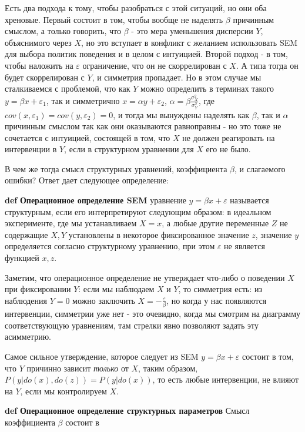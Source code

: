 \documentclass[fleqn]{article}
\def\define#1{\textbf{def} \textbf{#1}}
\numberwithin{equation}{section}
\numberwithin{theorem}{section}
\numberwithin{figure}{section}
\numberwithin{lemma}{section}
\numberwithin{corollary}{section}
\begin{document}
Есть два подхода к тому, чтобы разобраться с этой ситуаций, но они оба хреновые. Первый состоит в том, чтобы вообще не наделять $\beta$ причинным смыслом, а только говорить, что $\beta$ - это мера уменьшения дисперсии $Y$, объяснимого через $X$, но это вступает в конфликт с желанием использовать SEM для выбора политик поведения и в целом с интуицией. Второй подход - в том, чтобы наложить на $\varepsilon$ ограничение, что он не скоррелирован с $X$. А типа тогда он будет скоррелирован с $Y$, и симметрия пропадает. Но в этом случае мы сталкиваемся с проблемой, что как $Y$ можно определить в терминах такого $y = \beta x + \varepsilon_1$, так и симметрично $x = \alpha y + \varepsilon_2$, $\alpha = \beta \frac{\sigma_X^2}{\sigma_Y^2}$, где $cov(x, \varepsilon_1) = cov(y, \varepsilon_2) = 0$, и тогда мы вынуждены наделять как $\beta$, так и $\alpha$ причинным смыслом так как они оказываются равноправны - но это тоже не сочетается с интуицией, состоящей в том, что $X$ не должен реагировать на интервенции в $Y$, если в структурном уравнении для $X$ его не было.

В чем же тогда смысл структурных уравнений, коэффициента $\beta$, и слагаемого ошибки?  Ответ дает следующее определение:

\define{Операционное определение SEM} уравнение $y = \beta x + \varepsilon$ называется структурным, если его интерпретируют следующим образом: в идеальном эксперименте, где мы устанавливаем $X = x$, а любые другие переменные $Z$ не содержащие $X,Y$ установлены в некоторое фиксированное значение $z$, значение $y$ определяется согласно структурному уравнению, при этом $\varepsilon$ не является функцией $x,z$.

Заметим, что операционное определение не утверждает что-либо о поведении $X$ при фиксировании $Y$: если мы наблюдаем $X$ и $Y$, то симметрия есть: из наблюдения $Y = 0$ можно заключить $X = -\frac{\varepsilon}{\beta}$, но когда у нас появляются интервенции, симметрии уже нет - это очевидно, когда мы смотрим на диаграмму соответствующую уравнениям, там стрелки явно позволяют задать эту асимметрию. 

Самое сильное утверждение, которое следует из SEM $y = \beta x + \varepsilon$ состоит в том, что $Y$ причинно зависит \textit{только} от $X$, таким образом, $P(y|do(x),do(z)) = P(y|do(x))$, то есть любые интервенции,  не влияют на $Y$, если мы контролируем $X$.

\define{Операционное определение структурных параметров} Смысл коэффициента $\beta$ состоит в 
\end{document}
